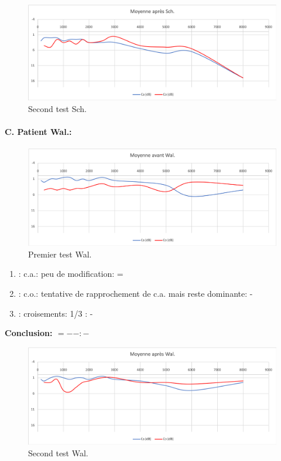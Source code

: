         \begin{figure}
\centering
\includegraphics[width=0.7\linewidth]{images/graphiques/schaff_post.png}
\caption[Moyenne OG+OD]{Second test Sch.}
       
\label{groupecontroleimage1}
\end{figure}


\paragraph{C. Patient Wal.:}



\begin{figure}
\centering
\includegraphics[width=0.7\linewidth]{images/graphiques/wal_pre.png}
\caption[Moyenne OG+OD]{Premier test Wal.}
       
\label{groupecontroleimage1}
\end{figure}

	\begin{enumerate}
 		
 		\item : c.a.: peu de modification: =
                
 		\item : c.o.: tentative de rapprochement de c.a. mais
                  reste dominante: -
 		\item : croisements: 1/3 :  -
                  
                \end{enumerate}

                \textbf{ Conclusion:  $= -  -        : -$ }

               \begin{figure}
\centering
\includegraphics[width=0.7\linewidth]{images/graphiques/wal_post.png}
\caption[Moyenne OG+OD]{Second test Wal.}
       
\label{groupecontroleimage1}
\end{figure}
                
